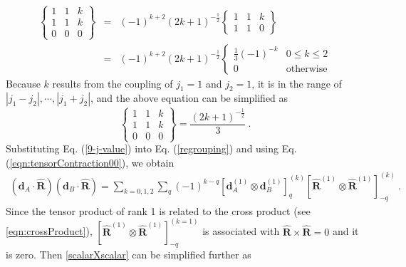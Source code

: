 \begin{eqnarray}
\left\{
\begin{array}{ccc}
1& 1&k \\
1&1&k \\
0&0&0 
\end{array}
\right\} 
&=& (-1)^{k+2} (2k+1)^{-\frac{1}{2}}
\left\{
\begin{array}{ccc}
1& 1&k \\
1&1&0 
\end{array}
\right\} \nonumber \\
&=& (-1)^{k+2} (2k+1)^{-\frac{1}{2}} 
\left\{ 
\begin{array}{cc}
\frac{1}{3} (-1)^{-k} & 0\leq k \leq 2 \\
0 & \mbox{otherwise}
\end{array}
\right.
\end{eqnarray}
Because $k$ results from the coupling of $j_{1}=1$ and $j_{2}=1$, it is in the range of $|j_{1}-j_{2}|, \cdots, |j_{1}+j_{2}|$, and the above equation can be simplified as
\begin{equation}
\left\{
\begin{array}{ccc}
1& 1&k \\
1&1&k \\
0&0&0 
\end{array}
\right\} = \frac{(2k + 1)^{-\frac{1}{2}}}{3} \ . \label{9-j-value}
\end{equation}  
Substituting Eq. (\ref{9-j-value}) into Eq. (\ref{regrouping}) and using Eq. (\ref{eqn:tensorContraction00}), we obtain
\begin{eqnarray}
(\mathbf{d}_{A}\cdot\mathbf{\hat{R} })(\mathbf{d}_{B}\cdot  \mathbf{\hat{R} })
= \sum_{k=0,1,2}\sum_{q} (-1)^{k-q} \left[ \mathbf{d}_{A}^{(1)} \otimes \mathbf{d}_{B}^{(1)} \right]^{(k)}_{q} \left[ \mathbf{\hat{R}}^{(1)} \otimes \mathbf{\hat{R}}^{(1)} \right]^{(k)}_{-q} \ . \label{scalarXscalar}
\end{eqnarray}
Since the tensor product of rank 1 is related to the cross product (see \autoref{eqn:crossProduct}), $\left[ \mathbf{\hat{R}}^{(1)} \otimes \mathbf{\hat{R}}^{(1)} \right]^{(k=1)}_{-q}$ is associated with $\mathbf{\hat{R}}\times\mathbf{\hat{R}}=0$ and it is zero. Then \autoref{scalarXscalar} can be simplified further as
